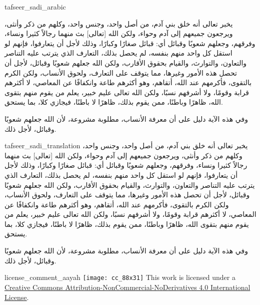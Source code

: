 \begin{taggedblock}{tafseer_sadi_arabic}
\begin{Arabic}
يخبر تعالى أنه خلق بني آدم، من أصل واحد، وجنس واحد، وكلهم من ذكر وأنثى، ويرجعون جميعهم إلى آدم وحواء، ولكن الله
[تعالى]
بث منهما رجالاً كثيرا ونساء، وفرقهم، وجعلهم شعوبًا وقبائل أي: قبائل صغارًا وكبارًا، وذلك لأجل أن يتعارفوا، فإنهم لو استقل كل واحد منهم بنفسه، لم يحصل بذلك، التعارف الذي يترتب عليه التناصر والتعاون، والتوارث، والقيام بحقوق الأقارب، ولكن الله جعلهم شعوبًا وقبائل، لأجل أن تحصل هذه الأمور وغيرها، مما يتوقف على التعارف، ولحوق الأنساب، ولكن الكرم بالتقوى، فأكرمهم عند الله، أتقاهم، وهو أكثرهم طاعة وانكفافًا عن المعاصي، لا أكثرهم قرابة وقومًا، ولا أشرفهم نسبًا، ولكن الله تعالى عليم خبير، يعلم من يقوم منهم بتقوى الله، ظاهرًا وباطنًا، ممن يقوم بذلك، ظاهرًا لا باطنًا، فيجازي كلا، بما يستحق.

وفي هذه الآية دليل على أن معرفة الأنساب، مطلوبة مشروعة، لأن الله جعلهم شعوبًا وقبائل، لأجل ذلك.
\end{Arabic}
\end{taggedblock}
\begin{taggedblock}{tafseer_sadi_translation}
يخبر تعالى أنه خلق بني آدم، من أصل واحد، وجنس واحد، وكلهم من ذكر وأنثى، ويرجعون جميعهم إلى آدم وحواء، ولكن الله
[تعالى]
بث منهما رجالاً كثيرا ونساء، وفرقهم، وجعلهم شعوبًا وقبائل أي: قبائل صغارًا وكبارًا، وذلك لأجل أن يتعارفوا، فإنهم لو استقل كل واحد منهم بنفسه، لم يحصل بذلك، التعارف الذي يترتب عليه التناصر والتعاون، والتوارث، والقيام بحقوق الأقارب، ولكن الله جعلهم شعوبًا وقبائل، لأجل أن تحصل هذه الأمور وغيرها، مما يتوقف على التعارف، ولحوق الأنساب، ولكن الكرم بالتقوى، فأكرمهم عند الله، أتقاهم، وهو أكثرهم طاعة وانكفافًا عن المعاصي، لا أكثرهم قرابة وقومًا، ولا أشرفهم نسبًا، ولكن الله تعالى عليم خبير، يعلم من يقوم منهم بتقوى الله، ظاهرًا وباطنًا، ممن يقوم بذلك، ظاهرًا لا باطنًا، فيجازي كلا، بما يستحق.

وفي هذه الآية دليل على أن معرفة الأنساب، مطلوبة مشروعة، لأن الله جعلهم شعوبًا وقبائل، لأجل ذلك.
\end{taggedblock}
\begin{taggedblock}{license_comment_aayah}
\texttt{[image: cc\_88x31]}
This work is licensed under a 
\href{http://creativecommons.org/licenses/by-nc-nd/4.0/}{Creative Commons Attribution-NonCommercial-NoDerivatives 4.0 International License}.
\end{taggedblock}
\begin{comment}
Please use the following for footnotes:- Sample\footnoteQ{Text of Qur'an footnote goes here.}.
Sample\footnoteT{Text of Tafseer footnote goes here.}.
\end{comment}